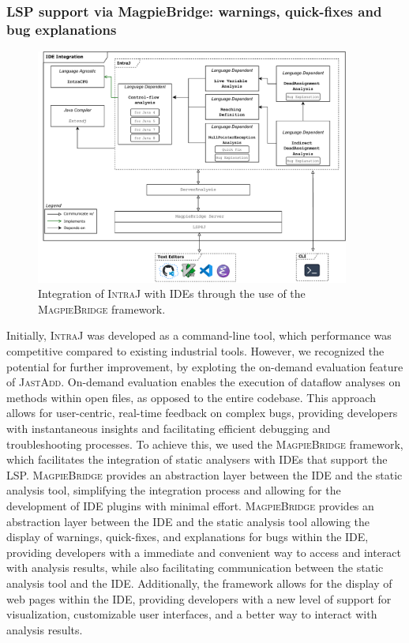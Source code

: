 \subsubsection{LSP support via MagpieBridge: warnings, quick-fixes and bug explanations}
\begin{figure}
  \centering
  \includegraphics[width=0.92\textwidth]{kappa/img/IDEIntegration.pdf}
  \caption{\label{fig:IDEIntegration} Integration of \textsc{IntraJ} with IDEs through the use of the \textsc{MagpieBridge} framework.}
\end{figure}
Initially, \textsc{IntraJ} was developed as a command-line tool, which performance was competitive
compared to existing industrial tools. However, we recognized the potential
for further improvement, by exploting the on-demand evaluation feature of \textsc{JastAdd}.
On-demand evaluation enables the execution of dataflow analyses
on methods within open files, as opposed to the entire codebase. This approach
allows for user-centric, real-time feedback on complex bugs, providing developers
with instantaneous insights and facilitating efficient debugging and troubleshooting
processes.
To achieve this, we used the \textsc{MagpieBridge} framework, which facilitates the integration
of static analysers with IDEs that support the LSP. \textsc{MagpieBridge} provides an
abstraction layer between the IDE and the static analysis tool, simplifying the
integration process and allowing for the development of IDE plugins with minimal effort.
\textsc{MagpieBridge} provides an abstraction layer between the IDE and the static
analysis tool allowing the display of warnings, quick-fixes, and explanations
for bugs within the IDE, providing developers with a immediate and convenient way to
access and interact with analysis results, while also facilitating communication
between the static analysis tool and the IDE. Additionally, the framework allows
for the display of web pages within the IDE, providing developers with a new level
of support for visualization, customizable user interfaces, and a better way to
interact with analysis results.

